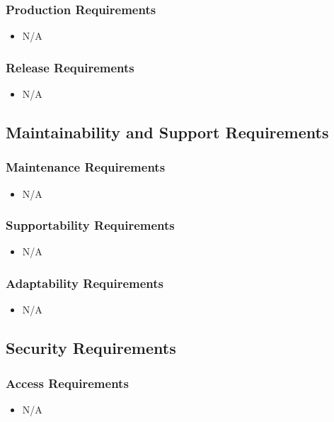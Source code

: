 \documentclass [12pt]{article}
\begin{document}
\subsubsection{Production Requirements}
	\begin{itemize}
		\item N/A
	\end{itemize} 

\subsubsection{Release Requirements}
	\begin{itemize}
		\item N/A
	\end{itemize}		

\subsection{Maintainability and Support Requirements }
\subsubsection{Maintenance Requirements }
	\begin{itemize}
		\item N/A
	\end{itemize}

\subsubsection{Supportability Requirements }
	\begin{itemize}
		\item N/A
	\end{itemize}

\subsubsection{Adaptability Requirements}
	\begin{itemize}
		\item N/A
	\end{itemize}

\subsection{Security Requirements }
\subsubsection{Access Requirements }
	\begin{itemize}
		\item N/A
	\end{itemize}
\end{document}
